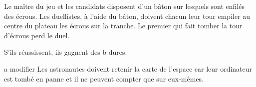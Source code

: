 \documentclass{grand-jeu}
\begin{document}
\begin{liste-materiel}
\end{liste-materiel}

\begin{regles}
Le maître du jeu et les candidats disposent d'un bâton sur lesquels sont enfilés des écrous. Les duellistes, à l'aide du bâton, doivent chacun leur tour empiler au centre du plateau les écrous sur la tranche. Le premier qui fait tomber la tour d'écrous perd le duel.

S’ils réussissent, ils gagnent des b-dures.
\end{regles}

\begin{imaginaire}
a modifier
Les astronautes doivent retenir la carte de l’espace car leur ordinateur est tombé en panne et il ne peuvent compter que sur eux-mêmes.
\end{imaginaire}

\begin{moments-stop}
\end{moments-stop}
\end{document}
